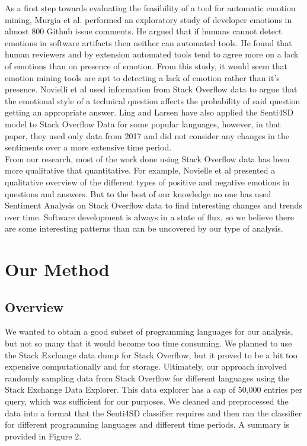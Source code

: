 \documentclass[conference]{IEEEtran}
\begin{document}
As a first step towards evaluating the feasibility of a tool for automatic emotion mining, Murgia et al. \cite{b39} performed an exploratory study of developer emotions in almost 800 Github issue comments. He argued that if humans cannot detect emotions in software artifacts then neither can automated tools. He found that human reviewers and by extension automated tools tend to agree more on a lack of emotions than on presence of emotion. From this study, it would seem that emotion mining tools are apt to detecting a lack of emotion rather than it's presence. Novielli et al\cite{b33} used information from Stack Overflow data to argue that the emotional style of a technical question affects the probability of said question getting an appropriate answer.  Ling and Larsen\cite{b11} have also applied the Senti4SD model to Stack Overflow Data for some popular languages, however, in that paper, they used only data from 2017 and did not consider any changes in the sentiments over a more extensive time period. \\

From our research, most of the work done using Stack Overflow data has been more qualitative that quantitative. For example, Novielle et al \cite{b34} presented a qualitative overview of the different types of positive and negative emotions in questions and answers. But to the best of our knowledge no one has used Sentiment Analysis on Stack Overflow data to find interesting changes and trends over time. Software development is always in a state of flux, so we believe there are some interesting patterns than can be uncovered by our type of analysis.\\

\section{Our Method}
 
\subsection{Overview}
We wanted to obtain a good subset of programming languages for our analysis, but not so many that it would become too time consuming. We planned to use the Stack Exchange data dump for Stack Overflow, but it proved to be a bit too expensive computationally and for storage. Ultimately, our approach involved randomly sampling data from Stack Overflow for different languages using the Stack Exchange Data Explorer\cite{b28}. This data explorer has a cap of 50,000 entries per query, which was sufficient for our purposes. We cleaned and preprocessed the data into a format that the Senti4SD classifier requires and then ran the classifier for different programming languages and different time periods. A summary is provided in Figure 2.\\
\end{document}
